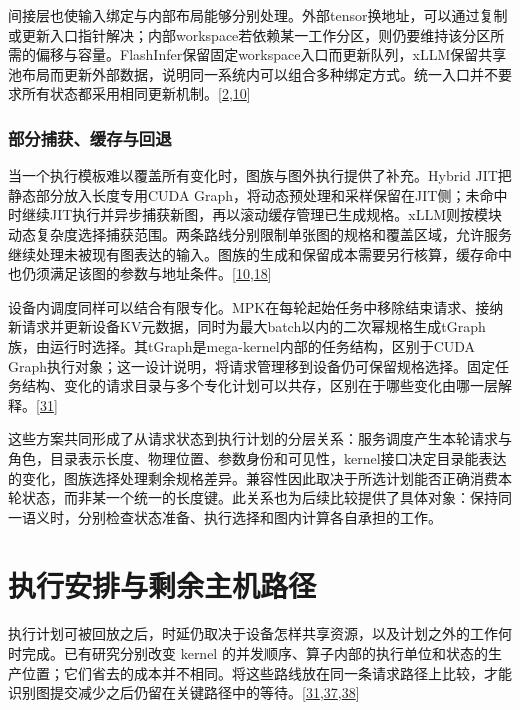 \documentclass[
  UTF8,
  zihao=5]{ctexart}
\begin{document}
间接层也使输入绑定与内部布局能够分别处理。外部tensor换地址，可以通过复制或更新入口指针解决；内部workspace若依赖某一工作分区，则仍要维持该分区所需的偏移与容量。FlashInfer保留固定workspace入口而更新队列，xLLM保留共享池布局而更新外部数据，说明同一系统内可以组合多种绑定方式。统一入口并不要求所有状态都采用相同更新机制。{[}\protect\hyperlink{ref-ye2025flashinfer}{2},\protect\hyperlink{ref-liu2025xllm}{10}{]}

\hypertarget{ux90e8ux5206ux6355ux83b7ux7f13ux5b58ux4e0eux56deux9000}{%
\subsubsection{部分捕获、缓存与回退}\label{ux90e8ux5206ux6355ux83b7ux7f13ux5b58ux4e0eux56deux9000}}

当一个执行模板难以覆盖所有变化时，图族与图外执行提供了补充。Hybrid
JIT把静态部分放入长度专用CUDA
Graph，将动态预处理和采样保留在JIT侧；未命中时继续JIT执行并异步捕获新图，再以滚动缓存管理已生成规格。xLLM则按模块动态复杂度选择捕获范围。两条路线分别限制单张图的规格和覆盖区域，允许服务继续处理未被现有图表达的输入。图族的生成和保留成本需要另行核算，缓存命中也仍须满足该图的参数与地址条件。{[}\protect\hyperlink{ref-liu2025xllm}{10},\protect\hyperlink{ref-yadav2026hybridpreprint}{18}{]}

设备内调度同样可以结合有限专化。MPK在每轮起始任务中移除结束请求、接纳新请求并更新设备KV元数据，同时为最大batch以内的二次幂规格生成tGraph族，由运行时选择。其tGraph是mega-kernel内部的任务结构，区别于CUDA
Graph执行对象；这一设计说明，将请求管理移到设备仍可保留规格选择。固定任务结构、变化的请求目录与多个专化计划可以共存，区别在于哪些变化由哪一层解释。{[}\protect\hyperlink{ref-cheng2026mpk}{31}{]}

这些方案共同形成了从请求状态到执行计划的分层关系：服务调度产生本轮请求与角色，目录表示长度、物理位置、参数身份和可见性，kernel接口决定目录能表达的变化，图族选择处理剩余规格差异。兼容性因此取决于所选计划能否正确消费本轮状态，而非某一个统一的长度键。此关系也为后续比较提供了具体对象：保持同一语义时，分别检查状态准备、执行选择和图内计算各自承担的工作。

\hypertarget{ux6267ux884cux5b89ux6392ux4e0eux5269ux4f59ux4e3bux673aux8defux5f84}{%
\section{执行安排与剩余主机路径}\label{ux6267ux884cux5b89ux6392ux4e0eux5269ux4f59ux4e3bux673aux8defux5f84}}

执行计划可被回放之后，时延仍取决于设备怎样共享资源，以及计划之外的工作何时完成。已有研究分别改变
kernel
的并发顺序、算子内部的执行单位和状态的生产位置；它们省去的成本并不相同。将这些路线放在同一条请求路径上比较，才能识别图提交减少之后仍留在关键路径中的等待。{[}\protect\hyperlink{ref-cheng2026mpk}{31},\protect\hyperlink{ref-ding2021ios}{37},\protect\hyperlink{ref-ma2020rammer}{38}{]}
\end{document}
